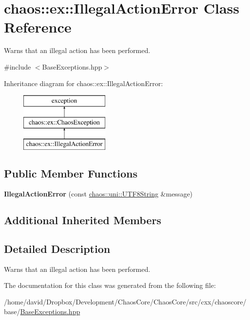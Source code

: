 \hypertarget{classchaos_1_1ex_1_1_illegal_action_error}{\section{chaos\-:\-:ex\-:\-:Illegal\-Action\-Error Class Reference}
\label{classchaos_1_1ex_1_1_illegal_action_error}
}


Warns that an illegal action has been performed.  




{\ttfamily \#include $<$Base\-Exceptions.\-hpp$>$}

Inheritance diagram for chaos\-:\-:ex\-:\-:Illegal\-Action\-Error\-:\begin{figure}[H]
\begin{center}
\leavevmode
\includegraphics[height=3.000000cm]{classchaos_1_1ex_1_1_illegal_action_error}
\end{center}
\end{figure}
\subsection*{Public Member Functions}
\begin{DoxyCompactItemize}
\item 
\hypertarget{classchaos_1_1ex_1_1_illegal_action_error_a96fbdbcf8802979b3e4e10321edd4213}{{\bfseries Illegal\-Action\-Error} (const \hyperlink{classchaos_1_1uni_1_1_u_t_f8_string}{chaos\-::uni\-::\-U\-T\-F8\-String} \&message)}\label{classchaos_1_1ex_1_1_illegal_action_error_a96fbdbcf8802979b3e4e10321edd4213}

\end{DoxyCompactItemize}
\subsection*{Additional Inherited Members}


\subsection{Detailed Description}
Warns that an illegal action has been performed. 

The documentation for this class was generated from the following file\-:\begin{DoxyCompactItemize}
\item 
/home/david/\-Dropbox/\-Development/\-Chaos\-Core/\-Chaos\-Core/src/cxx/chaoscore/base/\hyperlink{_base_exceptions_8hpp}{Base\-Exceptions.\-hpp}\end{DoxyCompactItemize}
